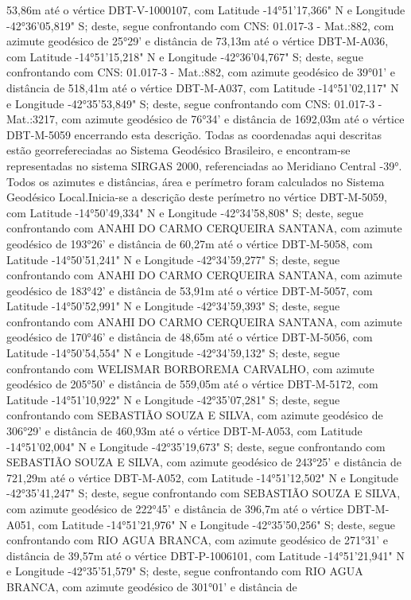53,86m  até o vértice DBT-V-1000107, com Latitude -14°51'17,366" N e Longitude -42°36'05,819" S; deste, segue confrontando com CNS: 01.017-3 - Mat.:882, com azimute geodésico de 25°29' e distância de 
73,13m  até o vértice DBT-M-A036, com Latitude -14°51'15,218" N e Longitude -42°36'04,767" S; deste, segue confrontando com CNS: 01.017-3 - Mat.:882, com azimute geodésico de 39°01' e distância de 
518,41m  até o vértice DBT-M-A037, com Latitude -14°51'02,117" N e Longitude -42°35'53,849" S; deste, segue confrontando com CNS: 01.017-3 - Mat.:3217, com azimute geodésico de 76°34' e distância de 
1692,03m  até o vértice DBT-M-5059 encerrando esta descrição. Todas as coordenadas aqui descritas estão georrefereciadas ao Sistema Geodésico Brasileiro, e encontram-se representadas no sistema SIRGAS 2000, referenciadas ao Meridiano Central -39°. Todos os azimutes e distâncias, área e perímetro foram calculados no Sistema Geodésico Local.Inicia-se a descrição deste perímetro no vértice DBT-M-5059, com Latitude -14°50'49,334" N e Longitude -42°34'58,808" S; deste, segue confrontando com ANAHI DO CARMO CERQUEIRA SANTANA, com azimute geodésico de 193°26' e distância de 60,27m até o vértice DBT-M-5058, com Latitude -14°50'51,241" N e Longitude -42°34'59,277" S; deste, segue confrontando com ANAHI DO CARMO CERQUEIRA SANTANA, com azimute geodésico de 183°42' e distância de 
53,91m  até o vértice DBT-M-5057, com Latitude -14°50'52,991" N e Longitude -42°34'59,393" S; deste, segue confrontando com ANAHI DO CARMO CERQUEIRA SANTANA, com azimute geodésico de 170°46' e distância de 
48,65m  até o vértice DBT-M-5056, com Latitude -14°50'54,554" N e Longitude -42°34'59,132" S; deste, segue confrontando com WELISMAR BORBOREMA CARVALHO, com azimute geodésico de 205°50' e distância de 
559,05m  até o vértice DBT-M-5172, com Latitude -14°51'10,922" N e Longitude -42°35'07,281" S; deste, segue confrontando com SEBASTIÃO SOUZA E SILVA, com azimute geodésico de 306°29' e distância de 
460,93m  até o vértice DBT-M-A053, com Latitude -14°51'02,004" N e Longitude -42°35'19,673" S; deste, segue confrontando com SEBASTIÃO SOUZA E SILVA, com azimute geodésico de 243°25' e distância de 
721,29m  até o vértice DBT-M-A052, com Latitude -14°51'12,502" N e Longitude -42°35'41,247" S; deste, segue confrontando com SEBASTIÃO SOUZA E SILVA, com azimute geodésico de 222°45' e distância de 
396,7m  até o vértice DBT-M-A051, com Latitude -14°51'21,976" N e Longitude -42°35'50,256" S; deste, segue confrontando com RIO AGUA BRANCA, com azimute geodésico de 271°31' e distância de 
39,57m  até o vértice DBT-P-1006101, com Latitude -14°51'21,941" N e Longitude -42°35'51,579" S; deste, segue confrontando com RIO AGUA BRANCA, com azimute geodésico de 301°01' e distância de 
